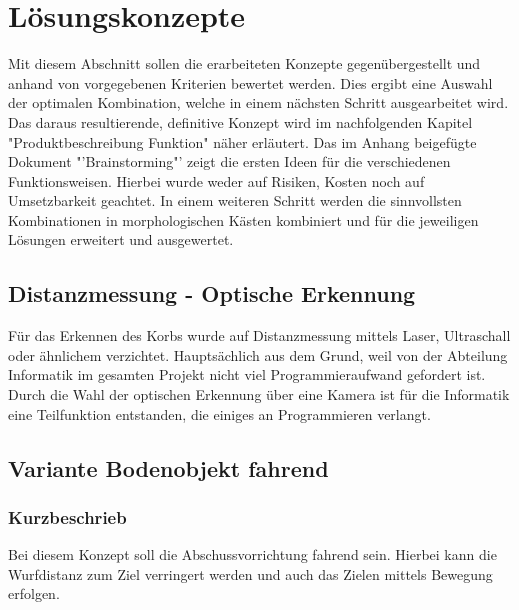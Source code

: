\newcommand{\morphcellwidth}
{
0.12\linewidth
}
\section{Lösungskonzepte}
Mit diesem Abschnitt sollen die erarbeiteten Konzepte gegenübergestellt und 
anhand von vorgegebenen Kriterien bewertet werden. Dies ergibt eine 
Auswahl der optimalen Kombination, welche in einem nächsten Schritt 
ausgearbeitet wird. Das daraus resultierende, definitive Konzept wird im nachfolgenden Kapitel "Produktbeschreibung Funktion" näher erläutert. 
Das im Anhang beigefügte Dokument "'Brainstorming"' zeigt die ersten Ideen für 
die verschiedenen Funktionsweisen. Hierbei wurde weder auf Risiken, Kosten 
noch auf Umsetzbarkeit geachtet. In einem weiteren Schritt werden die 
sinnvollsten Kombinationen in morphologischen Kästen kombiniert und für die 
jeweiligen Lösungen erweitert und ausgewertet. 

\subsection{Distanzmessung - Optische Erkennung}
Für das Erkennen des Korbs wurde auf Distanzmessung mittels Laser, Ultraschall oder ähnlichem verzichtet. Hauptsächlich aus dem Grund, weil von der Abteilung Informatik im gesamten Projekt nicht viel Programmieraufwand gefordert ist. Durch die Wahl der optischen Erkennung über eine Kamera ist für die Informatik eine Teilfunktion entstanden, die einiges an Programmieren verlangt.


\subsection{Variante Bodenobjekt fahrend}
\subsubsection{Kurzbeschrieb}
Bei diesem Konzept soll die Abschussvorrichtung fahrend sein. Hierbei kann 
die  Wurfdistanz zum Ziel verringert werden und auch das Zielen mittels 
Bewegung erfolgen.

